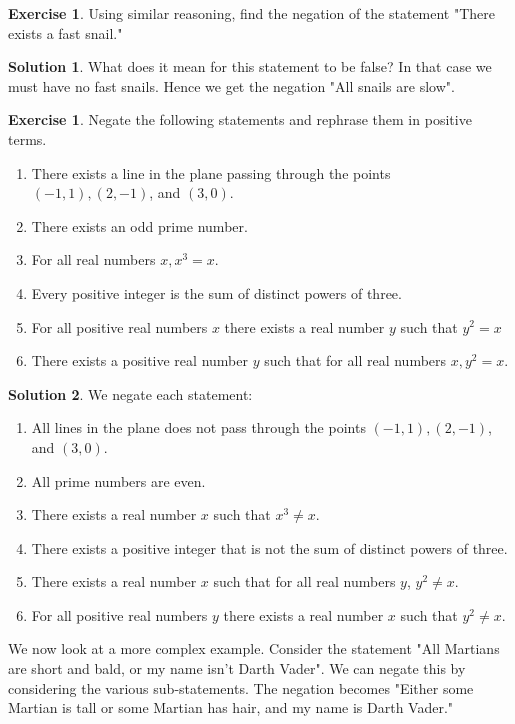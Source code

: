 \documentclass[a4paper, 11pt]{report}
\theoremstyle{plain}
\theoremstyle{definition}
\newtheorem{exrc}[thm]{Exercise}
\newtheorem*{sltn}{Solution}
\begin{document}
  \begin{exrc}
    Using similar reasoning, find the negation of the statement "There exists a fast snail."
  \end{exrc}
  \begin{sltn}
    What does it mean for this statement to be false? In that case we must have
    no fast snails. Hence we get the negation "All snails are slow".
  \end{sltn}
  
  \begin{exrc}
    Negate the following statements and rephrase them in positive terms.
    \begin{enumerate}
      \item There exists a line in the plane passing through the points $(-1, 1), (2, -1)$, and $(3, 0)$.
      \item There exists an odd prime number.
      \item For all real numbers $x, x^3 = x$.
      \item Every positive integer is the sum of distinct powers of three.
      \item For all positive real numbers $x$ there exists a real number $y$
        such that $y^2 = x$
      \item There exists a positive real number $y$ such that for all real
        numbers $x, y^2 = x$.
    \end{enumerate}
  \end{exrc}
  \begin{sltn} We negate each statement:
    \begin{enumerate} 
      \item All lines in the plane does not pass through the points $(-1, 1), (2, -1)$, and $(3, 0)$.
      \item All prime numbers are even.
      \item There exists a real number $x$ such that $x^3 \neq x$.
      \item There exists a positive integer that is not the sum of distinct powers of three.
      \item There exists a real number $x$ such that for all real numbers $y$, $y^2 \neq x$.
      \item For all positive real numbers $y$ there exists a real number $x$
        such that $y^2 \neq x$.
    \end{enumerate} 
  \end{sltn}

  We now look at a more complex example. Consider the statement "All Martians
  are short and bald, or my name isn't Darth Vader".  We can negate this by
  considering the various sub-statements.  The negation becomes "Either some
  Martian is tall or some Martian has hair, and my name is Darth Vader."
\end{document}
